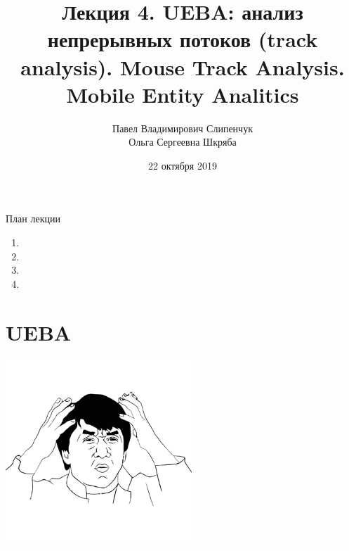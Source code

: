 


\title{Лекция 4. UEBA: анализ непрерывных потоков (track analysis). Mouse Track Analysis. Mobile Entity Analitics}

\date{22 октября 2019}
\author{Павел Владимирович Слипенчук \\ Ольга Сергеевна Шкряба}


  \maketitle
    
\begin{frame}{План лекции}
    \begin{enumerate}
    	\item {}
    	\item {}
		\item {}
		\item {}
	\end{enumerate}
\end{frame}

\section{UEBA}\label{section:ueba}
	\begin{center}
		\includegraphics[width=7cm]{../pic/Jackie_Chan.png}
		
		\LARGE
	\end{center}

